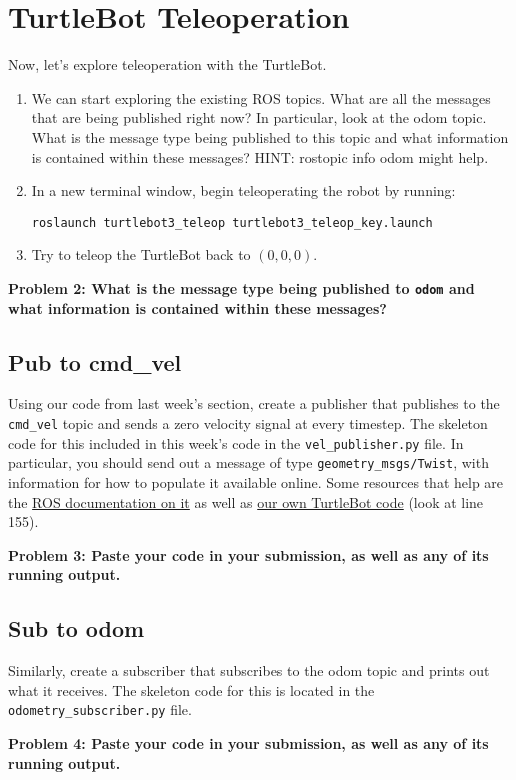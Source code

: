 \section{TurtleBot Teleoperation}

Now, let's explore teleoperation with the TurtleBot.

\begin{enumerate}
\item We can start exploring the existing ROS topics. What are all the messages that are being published right now? In particular, look at the odom topic. What is the message type being published to this topic and what information is contained within these messages? HINT: rostopic info odom might help.
\item In a new terminal window, begin teleoperating the robot by running:
\begin{lstlisting}
roslaunch turtlebot3_teleop turtlebot3_teleop_key.launch
\end{lstlisting}
\item Try to teleop the TurtleBot back to $(0,0,0)$.
\end{enumerate}

{\bf Problem 2: What is the message type being published to \texttt{odom} and what information is contained within these messages?}

\subsection{Pub to cmd\_vel}
Using our code from last week's section, create a publisher that publishes to the \texttt{cmd\_vel} topic and sends a zero velocity signal at every timestep. The skeleton code for this included in this week's code in the \texttt{vel\_publisher.py} file. In particular, you should send out a message of type \texttt{geometry\_msgs/Twist}, with information for how to populate it available online. Some resources that help are the \href{http://docs.ros.org/melodic/api/geometry_msgs/html/msg/Twist.html}{ROS documentation on it} as well as \href{https://github.com/StanfordASL/asl_turtlebot/blob/master/scripts/keyboard_teleop.py}{our own TurtleBot code} (look at line 155).

{\bf Problem 3: Paste your code in your submission, as well as any of its running output.}

\subsection{Sub to odom}
Similarly, create a subscriber that subscribes to the odom topic and prints out what it receives. The skeleton code for this is located in the \texttt{odometry\_subscriber.py} file.

{\bf Problem 4: Paste your code in your submission, as well as any of its running output.}
